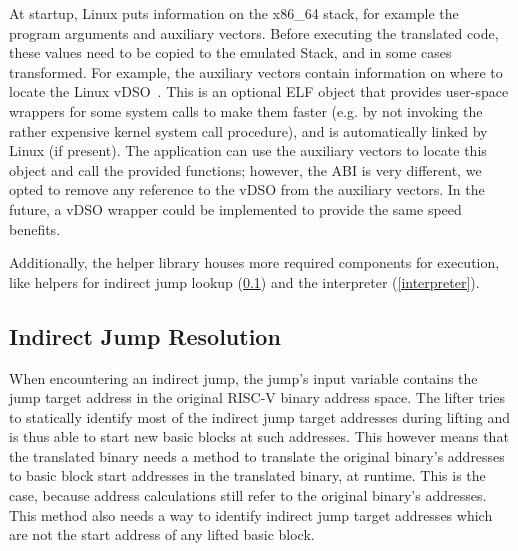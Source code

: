 \documentclass[course=eragp]{aspdoc}
\begin{document}
At startup, Linux puts information on the x86\_64 stack, for example the program arguments and auxiliary vectors. %
Before executing the translated code, these values need to be copied to the emulated Stack, and in some cases transformed.
For example, the auxiliary vectors contain information on where to locate the Linux vDSO~\cite{man_vdso}.
This is an optional ELF object that provides user-space wrappers for some system calls to make them faster (e.g. by not
invoking the rather expensive kernel system call procedure), and is automatically linked by Linux (if present).
The application can use the auxiliary vectors to locate this object and call the provided functions; however,
the ABI is very different, we opted to remove any reference to the vDSO from the auxiliary vectors.
In the future, a vDSO wrapper could be implemented to provide the same speed benefits.

Additionally, the helper library houses more required components for execution, like helpers for indirect jump lookup
(\ref{ijump_resolution}) and the interpreter (\ref{interpreter}).


\subsection{Indirect Jump Resolution}\label{ijump_resolution}

When encountering an indirect jump, the jump's input variable contains the jump target address in the
original RISC-V binary address space. The lifter tries to statically identify most of the indirect jump target
addresses during lifting and is thus able to start new basic blocks at such addresses.
This however means that the translated binary needs a method to translate the original binary's addresses to basic block start
addresses in the translated binary, at runtime. This is the case, because address calculations still
refer to the original binary's addresses. This method also needs a way to identify
indirect jump target addresses which are not the start address of any lifted basic block.
\end{document}
